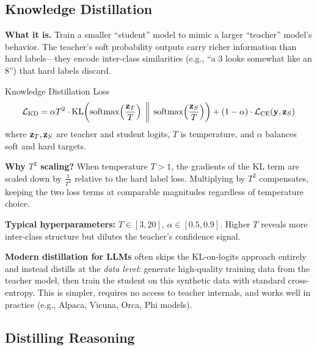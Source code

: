 \subsection{Knowledge Distillation}

\textbf{What it is.} Train a smaller ``student'' model to mimic a larger ``teacher'' model's behavior. The teacher's soft probability outputs carry richer information than hard labels---they encode inter-class similarities (e.g., ``a 3 looks somewhat like an 8'') that hard labels discard.

\begin{mathresult}{Knowledge Distillation Loss}
\begin{equation}
\mathcal{L}_{\text{KD}} = \alpha T^2 \cdot \operatorname{KL}\!\left(\operatorname{softmax}\!\left(\frac{\mathbf{z}_T}{T}\right) \;\bigg\|\; \operatorname{softmax}\!\left(\frac{\mathbf{z}_S}{T}\right)\right) + (1 - \alpha) \cdot \mathcal{L}_{\text{CE}}(\mathbf{y}, \mathbf{z}_S)
\end{equation}
where $\mathbf{z}_T, \mathbf{z}_S$ are teacher and student logits, $T$ is temperature, and $\alpha$ balances soft and hard targets.
\end{mathresult}

\textbf{Why $T^2$ scaling?} When temperature $T > 1$, the gradients of the KL term are scaled down by $\frac{1}{T^2}$ relative to the hard label loss. Multiplying by $T^2$ compensates, keeping the two loss terms at comparable magnitudes regardless of temperature choice.

\textbf{Typical hyperparameters:} $T \in [3, 20]$, $\alpha \in [0.5, 0.9]$. Higher $T$ reveals more inter-class structure but dilutes the teacher's confidence signal.

\textbf{Modern distillation for LLMs} often skips the KL-on-logits approach entirely and instead distills at the \textit{data level}: generate high-quality training data from the teacher model, then train the student on this synthetic data with standard cross-entropy. This is simpler, requires no access to teacher internals, and works well in practice (e.g., Alpaca, Vicuna, Orca, Phi models).

\subsection{Distilling Reasoning}
\label{subsec:distilling_reasoning}


